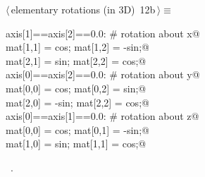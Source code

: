 \documentclass[11pt,oneside]{article}	%
\begin{document}
\begin{flushleft} \small \label{scrap26}
\protect{}$\langle\,$elementary rotations (in 3D)\nobreak\ {\footnotesize 12b}$\,\rangle\equiv$
\vspace{-1ex}
\begin{list}{}{} \item
\mbox{}\verb@if axis[1]==axis[2]==0.0:  # rotation about x@\\
\mbox{}\verb@   mat[1,1] = cos;   mat[1,2] = -sin;@\\
\mbox{}\verb@   mat[2,1] = sin;   mat[2,2] = cos;@\\
\mbox{}\verb@elif axis[0]==axis[2]==0.0:   # rotation about y@\\
\mbox{}\verb@   mat[0,0] = cos;   mat[0,2] = sin;@\\
\mbox{}\verb@   mat[2,0] = -sin;  mat[2,2] = cos;@\\
\mbox{}\verb@elif axis[0]==axis[1]==0.0:   # rotation about z@\\
\mbox{}\verb@   mat[0,0] = cos;   mat[0,1] = -sin;@\\
\mbox{}\verb@   mat[1,0] = sin;   mat[1,1] = cos;@\\
\mbox{}\verb@@{\NWsep}
\end{list}
\vspace{-1ex}
\footnotesize\addtolength{\baselineskip}{-1ex}
\begin{list}{}{\setlength{\itemsep}{-\parsep}\setlength{\itemindent}{-\leftmargin}}
\item \NWtxtMacroRefIn\ .
\end{list}
\end{flushleft}
\end{document}
